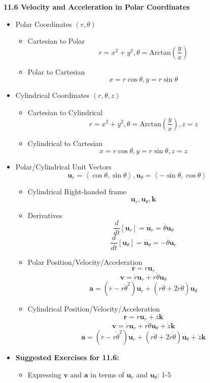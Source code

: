 \documentclass[12pt]{article}
\renewcommand{\vec}[1]{\mathbf{#1}}
\newcommand{\veck}{\mathbf{k}}
\newcommand{\<}{\left<}
\renewcommand{\>}{\right>}
\newcommand{\Arctan}{\text{Arctan}}
\begin{document}
\newpage

\centerline{\bf 11.6 Velocity and Acceleration in Polar Coordinates}

  \begin{itemize}
  
    \item Polar Coordinates $(r,\theta)$
      \begin{itemize}
        \item Cartesian to Polar
          \[r = x^2+y^2, \theta = \Arctan\left(\frac{y}{x}\right)\]
        \item Polar to Cartesian
          \[x = r\cos\theta, y=r\sin\theta\]
      \end{itemize}
      
    \item Cylindrical Coordinates $(r,\theta,z)$
      \begin{itemize}
        \item Cartesian to Cylindrical
          \[r = x^2+y^2, \theta = \Arctan\left(\frac{y}{x}\right), z=z\]
        \item Cylindrical to Cartesian
          \[x = r\cos\theta, y=r\sin\theta, z=z\]
      \end{itemize}
      
    \item Polar/Cylindrical Unit Vectors
      \[\vec{u}_r = \<\cos\theta,\sin\theta\>, \vec{u}_\theta = \<-\sin\theta,\cos\theta\>\]
      \begin{itemize}
        \item Cylindrical Right-handed frame
          \[\vec{u}_r,\vec{u}_\theta,\veck\]
        \item Derivatives
          \[\frac{d}{dt}\left[\vec{u}_r\right] = \dot{\vec{u}_r} = \dot{\theta}\vec{u}_\theta \]
          \[\frac{d}{dt}\left[\vec{u}_\theta\right] = \dot{\vec{u}_\theta} = -\dot{\theta}\vec{u}_r \]
        \item Polar Position/Velocity/Acceleration
          \[\vec{r} = r\vec{u}_r\]
          \[\vec{v} = \dot{r}\vec{u}_r + r\dot\theta\vec{u}_\theta\]
          \[\vec{a} = (\ddot{r} - r\dot\theta^2)\vec{u}_r + (r\ddot\theta + 2\dot{r}\dot\theta)\vec{u}_\theta\]
        \item Cylindrical Position/Velocity/Acceleration
          \[\vec{r} = r\vec{u}_r + z\veck\]
          \[\vec{v} = \dot{r}\vec{u}_r + r\dot\theta\vec{u}_\theta + \dot{z}\veck\]
          \[\vec{a} = (\ddot{r} - r\dot\theta^2)\vec{u}_r + (r\ddot\theta + 2\dot{r}\dot\theta)\vec{u}_\theta+\ddot{z}\veck\]
      \end{itemize}
    
    \item \textbf{ Suggested Exercises for 11.6:}
      \begin{itemize}
      \item Expressing $\vec{v}$ and $\vec{a}$ in terms of $\vec{u}_r$ and $\vec{u}_\theta$: 1-5
      \end{itemize}
  \end{itemize}
\end{document}
